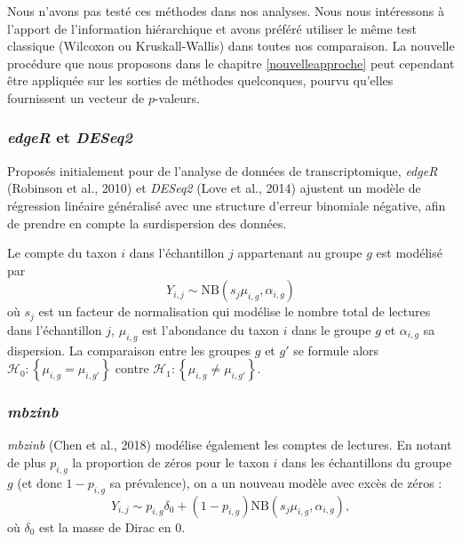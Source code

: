 \documentclass[12pt,a4paper]{reedthesis}
\theoremstyle{definition}
\theoremstyle{definition}
\theoremstyle{definition}
\theoremstyle{remark}
\begin{document}
Nous n'avons pas testé ces méthodes dans nos analyses. Nous nous intéressons à l'apport de l'information hiérarchique et avons préféré utiliser le même test classique (Wilcoxon ou Kruskall-Wallis) dans toutes nos comparaison. La nouvelle procédure que nous proposons dans le chapitre \ref{nouvelleapproche} peut cependant être appliquée sur les sorties de méthodes quelconques, pourvu qu'elles fournissent un vecteur de \(p\)-valeurs.

\hypertarget{edger-et-deseq2}{%
\subsubsection*{\texorpdfstring{\emph{edgeR} et \emph{DESeq2}}{edgeR et DESeq2}}\label{edger-et-deseq2}}

Proposés initialement pour de l'analyse de données de transcriptomique, \emph{edgeR} (Robinson et al., 2010) et \emph{DESeq2} (Love et al., 2014) ajustent un modèle de régression linéaire généralisé avec une structure d'erreur binomiale négative, afin de prendre en compte la surdispersion des données.

Le compte du taxon \(i\) dans l'échantillon \(j\) appartenant au groupe \(g\) est modélisé par
\begin{equation*}
Y_{i,j} \sim \text{NB}\left(s_j \mu_{i,g},\alpha_{i,g}\right)
\end{equation*}
où \(s_j\) est un facteur de normalisation qui modélise le nombre total de lectures dans l'échantillon \(j\), \(\mu_{i,g}\) est l'abondance du taxon \(i\) dans le groupe \(g\) et \(\alpha_{i,g}\) sa dispersion. La comparaison entre les groupes \(g\) et \(g'\) se formule alors \(\mathcal{H}_0 : \left\{\mu_{i,g} = \mu_{i,g'}\right\}\) contre \(\mathcal{H}_1 : \left\{\mu_{i,g} \neq \mu_{i,g'}\right\}\).

\hypertarget{mbzinb}{%
\subsubsection*{\texorpdfstring{\emph{mbzinb}}{mbzinb}}\label{mbzinb}}

\emph{mbzinb} (Chen et al., 2018) modélise également les comptes de lectures. En notant de plus \(p_{i,g}\) la proportion de zéros pour le taxon \(i\) dans les échantillons du groupe \(g\) (et donc \(1 - p_{i,g}\) sa prévalence), on a un nouveau modèle avec excès de zéros :
\begin{equation*}
Y_{i,j} \sim p_{i,g} \delta_0 + (1-p_{i,g}) \text{NB}\left(s_j\mu_{i,g},\alpha_{i,g}\right),
\end{equation*}
où \(\delta_0\) est la masse de Dirac en \(0\).
\end{document}
